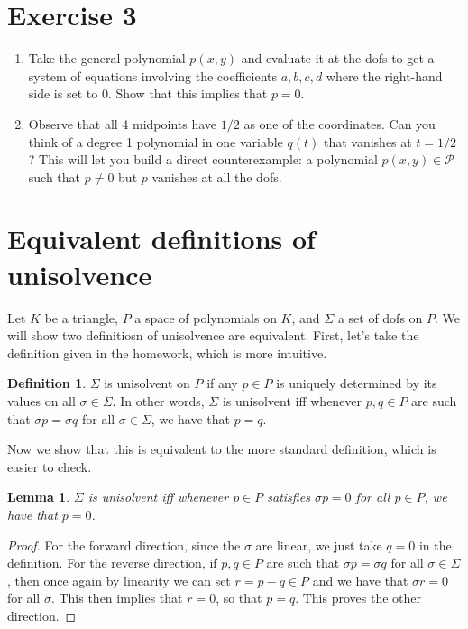 \documentclass{article}
\theoremstyle{plain}
\newtheorem{lemma}{Lemma}
\theoremstyle{definition}
\newtheorem{definition}{Definition}
\theoremstyle{remark}
\begin{document}
\section*{Exercise 3}
\begin{enumerate}
	\item Take the general polynomial $p(x,y)$ and evaluate it at the dofs to get a system of equations involving the coefficients $a,b,c,d$ where the right-hand side is set to $0$.
	      Show that this implies that $p = 0$.
	\item Observe that all 4 midpoints have $1/2$ as one of the coordinates.
	      Can you think of a degree 1 polynomial in one variable $q(t)$ that vanishes at $t = 1/2$?
	      This will let you build a direct counterexample: a polynomial $p(x,y) \in \mathcal P$ such that $p \neq 0$ but $p$ vanishes at all the dofs.
\end{enumerate}

\newpage
\appendix

\section{Equivalent definitions of unisolvence}\label{app:uni}
Let $K$ be a triangle, $P$ a space of polynomials on $K$, and $\Sigma$ a set of dofs on $P$.
We will show two definitiosn of unisolvence are equivalent.
First, let's take the definition given in the homework, which is more intuitive.
\begin{definition}
	$\Sigma$ is unisolvent on $P$ if any $p \in P$ is uniquely determined by its values on all $\sigma \in \Sigma$.
	In other words, $\Sigma$ is unisolvent iff whenever $p, q \in P$ are such that $\sigma p = \sigma q$ for all $\sigma \in \Sigma$, we have that $p = q$.
\end{definition}
Now we show that this is equivalent to the more standard definition, which is easier to check.
\begin{lemma}
	$\Sigma$ is unisolvent iff whenever $p \in P$ satisfies $\sigma p = 0$ for all $p \in P$, we have that $p = 0$.
\end{lemma}
\begin{proof}
	For the forward direction, since the $\sigma$ are linear, we just take $q = 0$ in the definition.
	For the reverse direction, if $p,q \in P$ are such that $\sigma p = \sigma q$ for all $\sigma \in \Sigma$, then once again by linearity we can set $r = p - q \in P$ and we have that $\sigma r = 0$ for all $\sigma$.
	This then implies that $r = 0$, so that $p = q$.
	This proves the other direction.
\end{proof}
\end{document}
